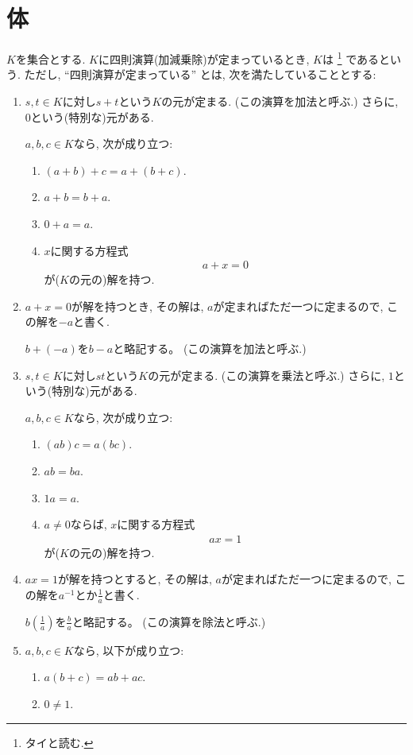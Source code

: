 \section{体}
$K$を集合とする.
$K$に四則演算(加減乗除)が定まっているとき,
$K$は
\footnote{タイと読む.}
であるという.
ただし,
``四則演算が定まっている''
とは, 次を満たしていることとする:
\begin{enumerate}
\item
  $s,t\in K$に対し$s+t$という$K$の元が定まる.
  (この演算を加法と呼ぶ.)
  さらに, $0$という(特別な)元がある.

  $a,b,c\in K$なら, 次が成り立つ:
  \begin{enumerate}
  \item
    $(a+b)+c=a+(b+c)$.
  \item
    $a+b=b+a$.
  \item
    $0+a=a$.
  \item
    $x$に関する方程式
    \begin{align*}
      a+x=0
    \end{align*}
    が($K$の元の)解を持つ.
  \end{enumerate}
\item
  $a+x=0$が解を持つとき,
  その解は,
  $a$が定まればただ一つに定まるので,
  この解を$-a$と書く.

  $b+(-a)$を$b-a$と略記する。
  (この演算を加法と呼ぶ.)

\item
  $s,t\in K$に対し$st$という$K$の元が定まる.
  (この演算を乗法と呼ぶ.)
  さらに, $1$という(特別な)元がある.

  $a,b,c\in K$なら, 次が成り立つ:
  \begin{enumerate}
  \item
    $(ab)c=a(bc)$.
  \item
    $ab=ba$.
  \item
    $1a=a$.
  \item
    $a\neq 0$ならば,
    $x$に関する方程式
    \begin{align*}
      ax=1
    \end{align*}
    が($K$の元の)解を持つ.
  \end{enumerate}

\item
  $ax=1$が解を持つとすると,
  その解は,
  $a$が定まればただ一つに定まるので,
  この解を$a^{-1}$とか$\frac{1}{a}$と書く.

  $b(\frac{1}{a})$を$\frac{b}{a}$と略記する。
  (この演算を除法と呼ぶ.)

\item
  $a,b,c\in K$なら, 以下が成り立つ:
  \begin{enumerate}
  \item $a(b+c)=ab+ac$.
  \item $0\neq 1$.
  \end{enumerate}
\end{enumerate}

